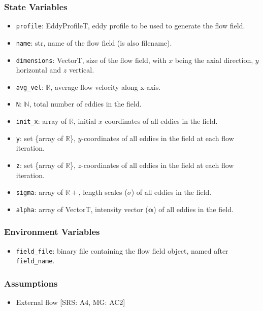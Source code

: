 \documentclass[12pt, titlepage]{article}
\begin{document}
\subsubsection{State Variables}
\begin{itemize}
  \item \texttt{profile}: EddyProfileT, eddy profile to be used to generate the flow field.
  \item \texttt{name}: str, name of the flow field (is also filename).
  \item \texttt{dimensions}: VectorT, size of the flow field, with $x$ being the axial direction, $y$ horizontal and $z$ vertical.
  \item \texttt{avg\_vel}: $\mathbb{R}$, average flow velocity along x-axis.
  \item \texttt{N}: $\mathbb{N}$, total number of eddies in the field.
  \item \texttt{init\_x}: array of $\mathbb{R}$, initial $x$-coordinates of all eddies in the field.
  \item \texttt{y}: set \{array of $\mathbb{R}$\}, $y$-coordinates of all eddies in the field at each flow iteration.
  \item \texttt{z}: set \{array of $\mathbb{R}$\}, $z$-coordinates of all eddies in the field at each flow iteration.
  \item \texttt{sigma}: array of $\mathbb{R+}$, length scales ($\sigma$) of all eddies in the field.
  \item \texttt{alpha}: array of VectorT, intensity vector ($\boldsymbol{\alpha}$) of all eddies in the field.
\end{itemize}

\subsubsection{Environment Variables}
\begin{itemize}
  \item \texttt{field\_file}: binary file containing the flow field object, named after \texttt{field\_name}.
\end{itemize}

\subsubsection{Assumptions}
\begin{itemize}
  \item External flow [SRS: A4, MG: AC2]
\end{itemize}
\end{document}
